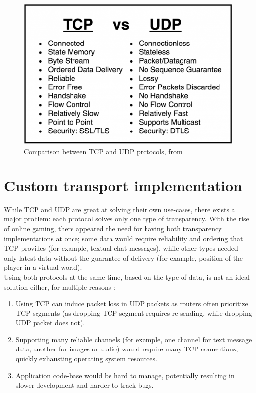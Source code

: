 \documentclass[times, utf8, diplomski]{fer}
\begin{document}
\begin{figure}[h!]
	\centering
	\includegraphics[scale=0.5]{TCP-vs-UDP}
	\caption{Comparison between TCP and UDP protocols, from \cite{NetBurner:TCP-vs-UDP}}
\end{figure}


\section{Custom transport implementation}
While TCP and UDP are great at solving their own use-cases, there exists a major problem: each protocol solves only one type of transparency. With the rise of online gaming, there appeared the need for having both transparency implementations at once; some data would require reliability and ordering that TCP provides (for example, textual chat messages), while other types needed only latest data without the guarantee of delivery (for example, position of the player in a virtual world). \\

Using both protocols at the same time, based on the type of data, is not an ideal solution either, for multiple reasons \cite{GafferOnGames:UDP-vs-TCP}:

\begin{enumerate}
	\item Using TCP can induce packet loss in UDP packets as routers often prioritize TCP segments (as dropping TCP segment requires re-sending, while dropping UDP packet does not).
	\item Supporting many reliable channels (for example, one channel for text message data, another for images or audio) would require many TCP connections, quickly exhausting operating system resources.
	\item Application code-base would be hard to manage, potentially resulting in slower development and harder to track bugs.
\end{enumerate}
\end{document}
